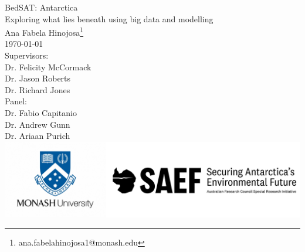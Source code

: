 \documentclass[12pt, a4paper, openany]{book}
\begin{document}
\begin{titlepage}
\begin{center}
    {\Huge BedSAT: Antarctica}\\ [1cm] 
    {\Large Exploring what lies beneath using big data and modelling}\\
    \vspace{5cm}
    {\large Ana Fabela Hinojosa\footnote{ana.fabelahinojosa1@monash.edu}}\\
    \monthyeardate\today\\ [1cm]
    Supervisors:\\
    Dr. Felicity McCormack\\
    Dr. Jason Roberts\\
    Dr. Richard Jones\\ [2cm]
    Panel:\\
    Dr. Fabio Capitanio \\
    Dr. Andrew Gunn \\
    Dr. Ariaan Purich \\ [3.5cm]
    \includegraphics[scale=0.2]{logos.png}

    \end{center}

\end{titlepage}



\end{document}
